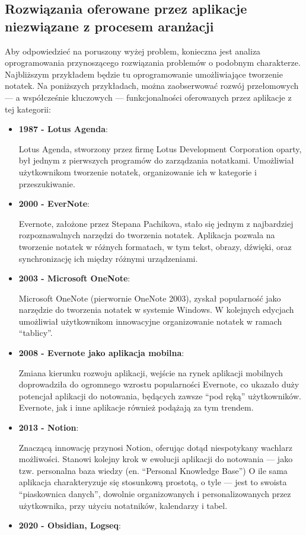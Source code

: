 \documentclass[12pt]{article}
\begin{document}
\subsection{Rozwiązania oferowane przez aplikacje niezwiązane z procesem aranżacji}
Aby odpowiedzieć na poruszony wyżej problem, konieczna jest analiza oprogramowania przynoszącego rozwiązania problemów
o podobnym charakterze. Najbliższym przykładem będzie tu oprogramowanie umożliwiające tworzenie notatek.
Na poniższych przykładach, można zaobserwować rozwój przełomowych — a współcześnie kluczowych — funkcjonalności oferowanych
przez aplikacje z tej kategorii:
\begin{itemize}
	\item \textbf{1987 - Lotus Agenda}:
	      
	      Lotus Agenda, stworzony przez firmę Lotus Development Corporation oparty, był jednym z pierwszych programów do
	      zarządzania notatkami.
	      Umożliwiał użytkownikom tworzenie notatek, organizowanie ich w kategorie i przeszukiwanie.
	\item \textbf{2000 - EverNote}:
	      
	      Evernote, założone przez Stepana Pachikova, stało się jednym z najbardziej rozpoznawalnych narzędzi do tworzenia
	      notatek.
	      Aplikacja pozwala na tworzenie notatek w różnych formatach, w tym tekst, obrazy, dźwięki,
	      oraz synchronizację ich między różnymi urządzeniami.
	\item \textbf{2003 - Microsoft OneNote}:
	      
	      Microsoft OneNote (pierwornie OneNote 2003), zyskał popularność jako narzędzie do tworzenia notatek w systemie
	      Windows.
	      W kolejnych edycjach umożliwiał użytkownikom innowacyjne organizowanie notatek w ramach \enquote{tablicy}.
	\item \textbf{2008 - Evernote jako aplikacja mobilna}:
	      
	      Zmiana kierunku rozwoju aplikacji, wejście na rynek aplikacji mobilnych doprowadziła do ogromnego wzrostu popularności Evernote,
	      co ukazało duży potencjał aplikacji do notowania, będących zawsze \enquote{pod ręką} użytkowników.
	      Evernote, jak i inne aplikacje również podążają za tym trendem.
	\item \textbf{2013 - Notion}:
	      
	      Znaczącą innowację przynosi Notion, oferując dotąd niespotykany wachlarz możliwości.
	      Stanowi kolejny krok w ewolucji aplikacji do notowania — jako tzw. personalna baza wiedzy (en.
	      \enquote{Personal Knowledge Base})
	      O ile sama aplikacja charakteryzuje się stosunkową prostotą, o tyle — jest to swoista \enquote{piaskownica danych},
	      dowolnie organizowanych i personalizowanych przez użytkownika, przy użyciu notatników, kalendarzy i tabel.
	\item \textbf{2020 - Obsidian, Logseq}:
	      

\end{itemize}
\end{document}
